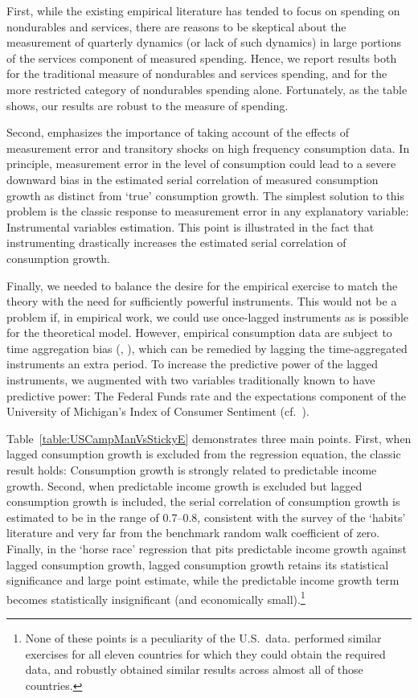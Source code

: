 \documentclass[titlepage]{article}
\begin{document}
First, while the existing empirical literature has tended to focus on spending on nondurables and services, there are reasons to be skeptical about the measurement of quarterly dynamics (or lack of such dynamics) in large portions of the services component of measured spending.
Hence, we report results both for the traditional measure of nondurables and services spending, and for the more restricted category of nondurables spending alone.  Fortunately, as the table shows, our results are robust to the measure of spending. 

Second, \cite{som07} emphasizes the importance of taking account of the effects of measurement error and transitory shocks on high frequency consumption data.  In principle, measurement error in the level of consumption could lead to a severe downward bias in the estimated serial correlation of measured consumption growth as distinct from `true' consumption growth.  The simplest solution to this problem is the classic response to measurement error in any explanatory variable: Instrumental variables estimation.  This point is illustrated in the fact that instrumenting drastically increases the estimated serial correlation of consumption growth.

Finally, we needed to balance the desire for the empirical exercise to match the theory with the need for sufficiently powerful instruments.  This would not be a problem if, in empirical work, we could use once-lagged instruments as is possible for the theoretical model.  However, empirical consumption data are subject to time aggregation bias (\cite{workingTimeAgg}, \cite{cmModel}), which can be remedied by lagging the time-aggregated instruments an extra period.  To increase the predictive power of the lagged instruments, we augmented with two variables traditionally known to have predictive power: The Federal Funds rate and the expectations component of the University of Michigan's Index of Consumer Sentiment (cf.\ \cite{cfwSentiment}). 

Table~\ref{table:USCampManVsStickyE} demonstrates three main points.  First, when lagged consumption growth is excluded from the regression equation, the classic \cite{cmModel} result holds: Consumption growth is strongly related to predictable income growth.  Second, when predictable income growth is excluded but lagged consumption growth is included, the serial correlation of consumption growth is estimated to be in the range of 0.7--0.8, consistent with the \cite{hrsHabit} survey of the `habits' literature and very far from the benchmark random walk coefficient of zero.  Finally, in the `horse race' regression that pits predictable income growth against lagged consumption growth, lagged consumption growth retains its statistical significance and large point estimate, while the predictable income growth term becomes statistically insignificant (and economically small).\footnote{None of these points is a peculiarity of the U.S.\ data.  \cite{cssIntlStickyC} performed similar exercises for all eleven countries for which they could obtain the required data, and robustly obtained similar results across almost all of those countries.}
\end{document}
